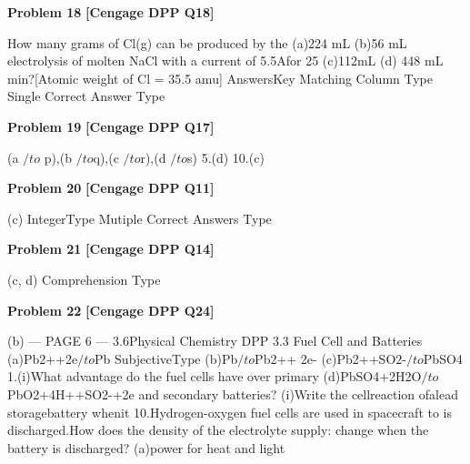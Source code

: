 \begin{problembox}
\textbf{Problem 18} \hfill \textbf{[Cengage DPP Q18]}
\label{q:ext-cng_dpp_all_questions-18}

How many grams of Cl(g) can be produced by the
(a)224 mL
(b)56 mL
electrolysis of molten NaCl with a current of 5.5Afor 25
(c)112mL
(d) 448 mL
min?[Atomic weight of Cl = 35.5 amu]
AnswersKey
Matching Column Type
Single Correct Answer Type
\end{problembox}

\begin{problembox}
\textbf{Problem 19} \hfill \textbf{[Cengage DPP Q17]}
\label{q:ext-cng_dpp_all_questions-19}

(a $/to$ p),(b $/to$q),(c $/to$r),(d $/to$s)
5.(d)
10.(c)
\end{problembox}

\begin{problembox}
\textbf{Problem 20} \hfill \textbf{[Cengage DPP Q11]}
\label{q:ext-cng_dpp_all_questions-20}

(c)
IntegerType
Mutiple Correct Answers Type
\end{problembox}

\begin{problembox}
\textbf{Problem 21} \hfill \textbf{[Cengage DPP Q14]}
\label{q:ext-cng_dpp_all_questions-21}

(c, d)
Comprehension Type
\end{problembox}

\begin{problembox}
\textbf{Problem 22} \hfill \textbf{[Cengage DPP Q24]}
\label{q:ext-cng_dpp_all_questions-22}

(b)
--- PAGE 6 ---
3.6Physical Chemistry
DPP 3.3
Fuel Cell and Batteries
(a)Pb2++2e$/to$Pb
SubjectiveType
(b)Pb$/to$Pb2++ 2e-
(c)Pb2++SO$2$-$/to$PbSO4
1.(i)What advantage do the fuel cells have over primary
(d)PbSO4+2H2O$/to$PbO2+4H++SO2-+2e
and secondary batteries?
(i)Write the cellreaction ofalead storagebattery whenit
10.Hydrogen-oxygen fuel cells are used in spacecraft to
is discharged.How does the density of the electrolyte
supply:
change when the battery is discharged?
(a)power for heat and light
\end{problembox}

